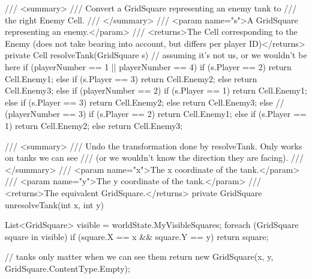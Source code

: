 \documentclass[11pt]{article}
\begin{document}
\begin{code}
{{        /// <summary>
        /// Convert a GridSquare representing an enemy tank to
        /// the right Enemy Cell.
        /// </summary>
        /// <param name="s">A GridSquare representing an enemy.</param>
        /// <returns>The Cell corresponding to the Enemy (does not take bearing into account, but differs per player ID)</returns>
        private Cell resolveTank(GridSquare s)
        {
            // assuming it's not us, or we wouldn't be here
            if (playerNumber == 1 || playerNumber == 4)
            {
                if (s.Player == 2)
                {
                    return Cell.Enemy1;
                }
                else if (s.Player == 3)
                {
                    return Cell.Enemy2;
                }
                else
                {
                    return Cell.Enemy3;
                }
            } else if (playerNumber == 2)
            {
                if (s.Player == 1)
                {
                    return Cell.Enemy1;
                }
                else if (s.Player == 3)
                {
                    return Cell.Enemy2;
                }
                else
                {
                    return Cell.Enemy3;
                }
            } else  // (playerNumber == 3)
            {
                if (s.Player == 2)
                {
                    return Cell.Enemy1;
                }
                else if (s.Player == 1)
                {
                    return Cell.Enemy2;
                }
                else
                {
                    return Cell.Enemy3;
                }
            }            
        }

        /// <summary>
        /// Undo the transformation done by resolveTank. Only works on tanks we can see
        /// (or we wouldn't know the direction they are facing).
        /// </summary>
        /// <param name="x">The x coordinate of the tank.</param>
        /// <param name="y">The y coordinate of the tank.</param>
        /// <returns>The equivalent GridSquare.</returns>
        private GridSquare unresolveTank(int x, int y)
        {
            List<GridSquare> visible = worldState.MyVisibleSquares;
            foreach (GridSquare square in visible)
            {
                if (square.X == x && square.Y == y)
                {
                    return square;
                }
            }

            // tanks only matter when we can see them
            return new GridSquare(x, y, GridSquare.ContentType.Empty);
        }

}}
\end{code}
\end{document}
